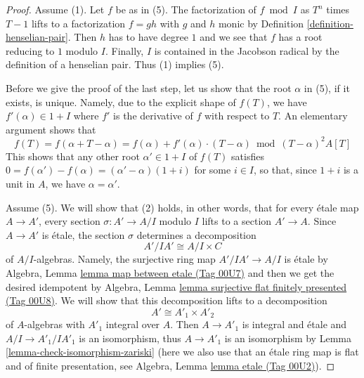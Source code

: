 \documentclass{amsart}
\theoremstyle{plain}
\theoremstyle{definition}
\theoremstyle{remark}
\numberwithin{equation}{subsection}
\begin{document}
\begin{proof}
\medskip\noindent
Assume (1). Let $f$ be as in (5). The factorization of $f \bmod I$
as $T^n$ times $T - 1$ lifts to a factorization $f = gh$ with $g$
and $h$ monic by Definition \ref{definition-henselian-pair}.
Then $h$ has to have degree $1$
and we see that $f$ has a root reducing to $1$ modulo $I$.
Finally, $I$ is contained in the Jacobson radical by
the definition of a henselian pair.
Thus (1) implies (5).

\medskip\noindent
Before we give the proof of the last step, let us show that
the root $\alpha$ in (5), if it exists, is unique. Namely,
due to the explicit shape of $f(T)$, we have
$f'(\alpha) \in 1 + I$ where $f'$ is the derivative of $f$ with
respect to $T$. An elementary argument shows that
$$
f(T) = f(\alpha + T - \alpha) =
f(\alpha) + f'(\alpha) \cdot (T - \alpha) \bmod
(T - \alpha)^2 A[T]
$$
This shows that any other root $\alpha' \in 1 + I$ of $f(T)$
satisfies $0 = f(\alpha') - f(\alpha) = (\alpha' - \alpha)(1 + i)$
for some $i \in I$, so that, since $1 + i$ is a unit in $A$,
we have $\alpha = \alpha'$.

\medskip\noindent
Assume (5). We will show that (2) holds, in other words, that
for every \'etale map $A \to A'$, every section $\sigma : A' \to A/I$
modulo $I$ lifts to a section $A' \to A$.
Since $A \to A'$ is \'etale, the section $\sigma$
determines a decomposition
\begin{equation}
\label{equation-GCHP}
A'/IA' \cong A/I \times C
\end{equation}
of $A/I$-algebras. Namely, the surjective ring map
$A'/IA' \to A/I$ is \'etale by
Algebra, Lemma \href{https://stacks.math.columbia.edu/tag/00U7}{lemma map between etale (Tag 00U7)}
and then we get the desired idempotent by
Algebra, Lemma \href{https://stacks.math.columbia.edu/tag/00U8}{lemma surjective flat finitely presented (Tag 00U8)}.
We will show that this decomposition lifts to a decomposition 
\begin{equation}
\label{equation-GCHP-want}
A' \cong A'_1 \times A'_2
\end{equation}
of $A$-algebras with $A'_1$ integral over $A$. Then $A \to A'_1$
is integral and \'etale and $A/I \to A'_1/IA'_1$ is an isomorphism,
thus $A \to A'_1$ is an isomorphism by
Lemma \ref{lemma-check-isomorphism-zariski}
(here we also use that an \'etale ring map is flat
and of finite presentation, see Algebra, Lemma \href{https://stacks.math.columbia.edu/tag/00U2}{lemma etale (Tag 00U2)}).


\end{proof}
\end{document}
